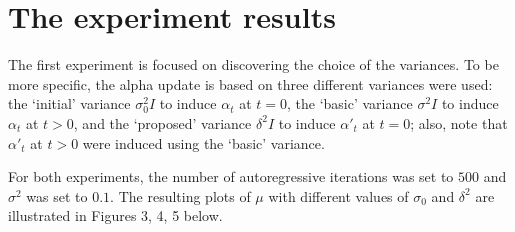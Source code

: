 \documentclass[12pt]{article}
\begin{document}
\section*{The experiment results}

\par The first experiment is focused on discovering the choice of the variances. To be more specific, the alpha update is based on three different variances were used: the `initial' variance $\sigma_0^2I$ to induce $\alpha_t$ at $t=0$, the `basic' variance $\sigma^2I$ to induce $\alpha_t$ at $t>0$, and the `proposed' variance $\delta^2I$ to induce $\alpha'_t$ at $t=0$; also, note that $\alpha'_t$ at $t>0$ were induced using the `basic' variance.

\par For both experiments, the number of autoregressive iterations was set to $500$ and $\sigma^2$ was set to $0.1$. The resulting plots of $\mu$ with different values of $\sigma_0$ and $\delta^2$ are illustrated in Figures 3, 4, 5 below.
\end{document}
